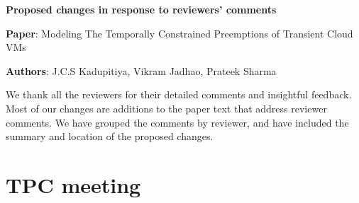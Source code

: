 \documentclass{article}
\begin{document}
\begin{center}
  \large{\textbf {Proposed changes in response to reviewers'
      comments}}

{\textbf{Paper}:  Modeling The Temporally Constrained Preemptions of Transient Cloud VMs}

{\textbf{Authors}: J.C.S Kadupitiya, Vikram Jadhao, Prateek Sharma}
\end{center}

\date{April 1 2020}

We thank all the reviewers for their detailed comments and insightful feedback.
Most of our changes are additions to the paper text that address reviewer comments. 
We have grouped the comments by reviewer, and have included the summary and location of the proposed changes.



\section{TPC meeting}
\end{document}
